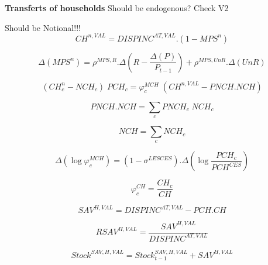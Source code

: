 \documentclass[12pt]{article}
\numberwithin{equation}{section}
\begin{document}
\textbf{Transferts of households}
Should be endogenous? Check V2



Should be Notional!!!
\begin{dmath}
CH^{n,VAL} = DISPINC^{AT,VAL} . \left( 1 - MPS^{n} \right)
\end{dmath}


\begin{dmath}
\varDelta \left(MPS^{n}\right) = \rho^{MPS,R} . \varDelta \left(R - \frac{\varDelta \left(P\right)}{P_{t-1}}\right) + \rho^{MPS,UnR} . \varDelta \left(UnR\right)
\end{dmath}


\begin{dmath}
\left( CH^{n}_{c} - NCH_{c} \right) \; PCH_{c} = \varphi^{MCH}_{c} \; \left( CH^{n,VAL} - PNCH . NCH \right)
\end{dmath}


\begin{dmath}
PNCH . NCH = \sum_{c} PNCH_{c} \; NCH_{c}
\end{dmath}

\begin{dmath}
NCH = \sum_{c} NCH_{c}
\end{dmath}



\begin{dmath}
\varDelta \left(\operatorname{log} \varphi^{MCH}_{c}\right) = \left( 1 - \sigma^{LESCES} \right) . \varDelta \left(\operatorname{log} \frac{PCH_{c}}{PCH^{CES}}\right)
\end{dmath}


\begin{dmath}
\varphi^{CH}_{c} = \frac{CH_{c}}{CH}
\end{dmath}





\begin{dmath}
SAV^{H,VAL} = DISPINC^{AT,VAL} - PCH . CH
\end{dmath}


\begin{dmath}
RSAV^{H,VAL} = \frac{SAV^{H,VAL}}{DISPINC^{AT,VAL}}
\end{dmath}


\begin{dmath}
Stock^{SAV,H,VAL} = Stock^{SAV,H,VAL}_{t-1} + SAV^{H,VAL}
\end{dmath}
\end{document}
